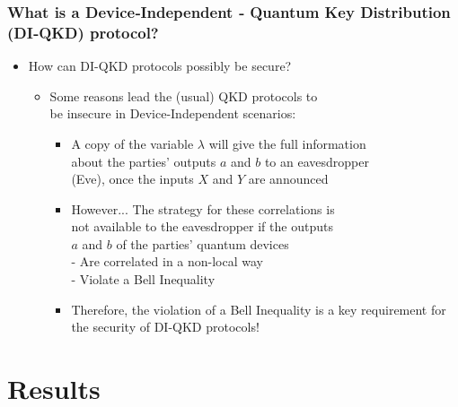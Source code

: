 \documentclass{beamer}
\begin{document}
		\begin{frame}
			\frametitle{\footnotesize What is a Device‑Independent ‑ Quantum Key Distribution (DI‑QKD) protocol?}

            \vspace{1ex}
            \begin{itemize}
                \item How can DI-QKD protocols possibly be secure?
                \begin{itemize}
                    \item Some reasons lead the (usual) QKD protocols to\\ be insecure in Device-Independent scenarios:
                    \begin{itemize}
                        \item A copy of the variable $\lambda$ will give the full information\\about the parties' outputs $a$ and $b$ to an eavesdropper\\ (Eve), once the inputs $X$ and $Y$ are announced
                        \vspace{1.5ex}
                        \item However... The strategy for these correlations is\\ not available to the eavesdropper if the outputs\\ $a$ and $b$ of the parties' quantum devices\\
                        - Are correlated in a non-local way\\
                        - Violate a Bell Inequality
                        \vspace{1ex}
                        \item Therefore, the violation of a Bell Inequality is a key requirement for the security of DI-QKD protocols!
                    \end{itemize}
                \end{itemize}
            \end{itemize}
		\end{frame}

    \section{Results}
\end{document}

